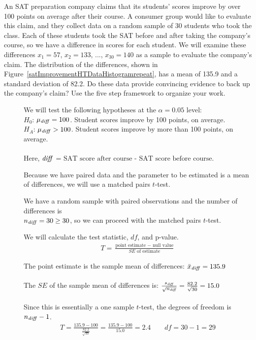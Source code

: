 \begin{examplewrap}
\begin{nexample}
{An SAT preparation company claims that its students' scores improve by over 100 points on average after their course. A consumer group would like to evaluate this claim, and they collect data on a random sample of 30 students who took the class. Each of these students took the SAT before and after taking the company's course, so we have a difference in scores for each student. We will examine these differences $x_1=57$, $x_2=133$, ..., $x_{30}=140$ as a sample to evaluate the company's claim. The distribution of the differences, shown in Figure~\ref{satImprovementHTDataHistogramrepeat}, has a mean of 135.9 and a standard deviation of 82.2. Do these data provide convincing evidence to back up the company's claim?  Use the five step framework to organize your work.  
}
\begin{description}
\item[] We will test the following hypotheses at the $\alpha=0.05$ level:\\
$H_0$: $\mu_{\text{\emph{diff}}} = 100$. Student scores improve by 100 points, on average.   \\
$H_A$: $\mu_{\text{\emph{diff}}} > 100$. Student scores improve by more than 100 points, on average.
\\
\\
Here,  ${\text{\emph{diff}}}$ = ${\text{SAT score after course - SAT score before course}}$.

\item[] Because we have paired data and the parameter to be estimated is a mean of differences, we will use a matched pairs $t$-test.

\item[] We have a random sample with paired observations and the number of differences is \\
$n_{\text{\emph{diff}}}=30\ge 30$, so we can proceed with the matched pairs $t$-test.  
 
\item[]  We will calculate the test statistic, $df$, and p-value.
\begin{align*}
T = \frac{\text{point estimate } - \text{ null value}}{SE \text{ of estimate}}
\end{align*}

The point estimate is the sample mean of differences:  $\bar{x}_{\text{\emph{diff}}}  = 135.9$ 
\\
\\
The $SE$ of the sample mean of differences is:  $\frac{s_{\text{\emph{diff}}} }{\sqrt{n_{\text{\emph{diff}}} }} = \frac{82.2}{\sqrt{30}} = 15.0$
\\
\\
Since this is essentially a one sample $t$-test, the degrees of freedom is $n_{\text{\emph{diff}}}-1$.
\begin{align*}
T = \frac{135.9-100}{\frac{82.2}{\sqrt{30}}} = \frac{135.9-100}{15.0}=2.4 \qquad df=30-1=29
\end{align*}


\end{description}
\end{nexample}
\end{examplewrap}
